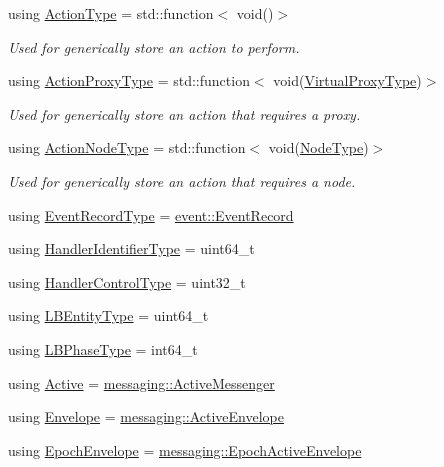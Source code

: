 \begin{DoxyCompactItemize}
using \hyperlink{namespacevt_ae0a5a7b18cc99d7b732cb4d44f46b0f3}{Action\+Type} = std\+::function$<$ void()$>$
\begin{DoxyCompactList}\small\item\em Used for generically store an action to perform. \end{DoxyCompactList}\item 
using \hyperlink{namespacevt_a102aa105d64254d89f7e585d106c95aa}{Action\+Proxy\+Type} = std\+::function$<$ void(\hyperlink{namespacevt_a1b417dd5d684f045bb58a0ede70045ac}{Virtual\+Proxy\+Type})$>$
\begin{DoxyCompactList}\small\item\em Used for generically store an action that requires a proxy. \end{DoxyCompactList}\item 
using \hyperlink{namespacevt_a0436cb2d620dcbb21b5b49cd9c9c4749}{Action\+Node\+Type} = std\+::function$<$ void(\hyperlink{namespacevt_a866da9d0efc19c0a1ce79e9e492f47e2}{Node\+Type})$>$
\begin{DoxyCompactList}\small\item\em Used for generically store an action that requires a node. \end{DoxyCompactList}\item 
using \hyperlink{namespacevt_a2dc2f149222f88a250ec9a13db36865d}{Event\+Record\+Type} = \hyperlink{structvt_1_1event_1_1_event_record}{event\+::\+Event\+Record}
\item 
using \hyperlink{namespacevt_a59ae068fe828d1c33051ff96f3d016b6}{Handler\+Identifier\+Type} = uint64\+\_\+t
\item 
using \hyperlink{namespacevt_adbbef13b92f0a93b14c219b7cc8a48f2}{Handler\+Control\+Type} = uint32\+\_\+t
\item 
using \hyperlink{namespacevt_a92ec26fb6644cd0ba7eb0ee70c96bee5}{L\+B\+Entity\+Type} = uint64\+\_\+t
\item 
using \hyperlink{namespacevt_a5505d0bab25ce2ff566a8e015871b379}{L\+B\+Phase\+Type} = int64\+\_\+t
\item 
using \hyperlink{namespacevt_ad548cc368cddb926753ac237eb454dae}{Active} = \hyperlink{structvt_1_1messaging_1_1_active_messenger}{messaging\+::\+Active\+Messenger}
\item 
using \hyperlink{namespacevt_aa9c8cc094b5361482021d63012987814}{Envelope} = \hyperlink{structvt_1_1messaging_1_1_active_envelope}{messaging\+::\+Active\+Envelope}
\item 
using \hyperlink{namespacevt_af71a025689a3da5037785b53a7a8e78c}{Epoch\+Envelope} = \hyperlink{structvt_1_1messaging_1_1_epoch_active_envelope}{messaging\+::\+Epoch\+Active\+Envelope}

\end{DoxyCompactItemize}
